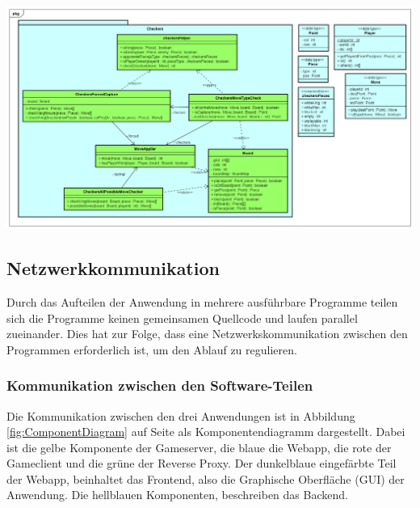 \documentclass[12pt,a4paper,bibliography=totocnumbered,listof=totocnumbered]{article}
\begin{document}
\vspace{1em}
\begin{minipage}{\linewidth}
	\centering
	\includegraphics[width=1.0\linewidth]{pics/GameLogic.png}
	\label{fig:GameLogic}
\end{minipage}



\subsection{Netzwerkkommunikation}
\label{chap:Networkcom}
Durch das Aufteilen der Anwendung in mehrere ausführbare Programme teilen sich die Programme keinen gemeinsamen Quellcode und laufen parallel zueinander. 
Dies hat zur Folge, dass eine Netzwerkskommunikation zwischen den Programmen erforderlich ist, um den Ablauf zu regulieren.

\subsubsection{Kommunikation zwischen den Software-Teilen}
Die Kommunikation zwischen den drei Anwendungen ist in Abbildung \ref{fig:ComponentDiagram} auf Seite \pageref{fig:ComponentDiagram} als 
Komponentendiagramm dargestellt. Dabei ist die gelbe Komponente der Gameserver, die blaue die Webapp, die rote der Gameclient und die grüne der Reverse Proxy.
Der dunkelblaue eingefärbte Teil der Webapp, beinhaltet das Frontend, also die Graphische Oberfläche (GUI) der Anwendung.
Die hellblauen Komponenten, beschreiben das Backend. 
\end{document}
